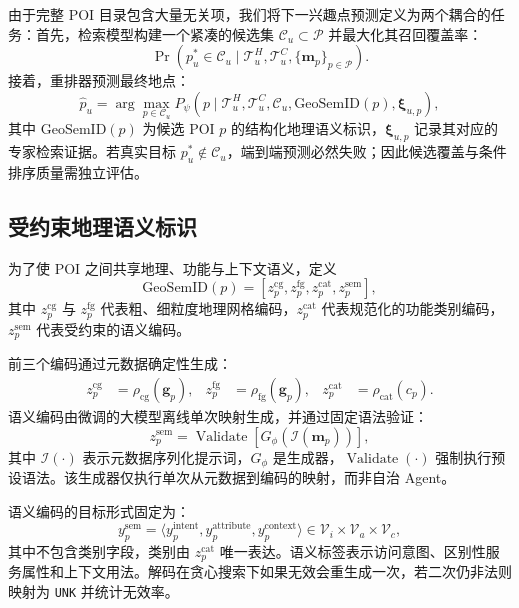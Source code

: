 \documentclass[10pt,fontset=none,twocolumn]{ctexart}
\newcommand{\gsid}{\mathrm{GeoSemID}}
\newcommand{\POIs}{\mathcal{P}}
\begin{document}
由于完整 POI 目录包含大量无关项，我们将下一兴趣点预测定义为两个耦合的任务：首先，检索模型构建一个紧凑的候选集 $\mathcal{C}_u\subset\POIs$ 并最大化其召回覆盖率：
\begin{equation}
\Pr(p_u^{*}\in\mathcal{C}_u
\mid
\mathcal{T}_{u}^{H},\mathcal{T}_{u}^{C},\{\bm{m}_p\}_{p\in\POIs}).
\label{eq:coverage_objective}
\end{equation}
接着，重排器预测最终地点：
\begin{equation}
\widehat{p}_{u}
=
\arg\max_{p\in\mathcal{C}_u}
P_{\psi}
\left(
p\mid
\mathcal{T}_{u}^{H},
\mathcal{T}_{u}^{C},
\mathcal{C}_u,
\gsid(p),
\bm{\xi}_{u,p}
\right),
\label{eq:final_prediction}
\end{equation}
其中 $\gsid(p)$ 为候选 POI $p$ 的结构化地理语义标识，$\bm{\xi}_{u,p}$ 记录其对应的专家检索证据。若真实目标 $p_u^{*}\notin\mathcal{C}_u$，端到端预测必然失败；因此候选覆盖与条件排序质量需独立评估。

\subsection{受约束地理语义标识}

为了使 POI 之间共享地理、功能与上下文语义，定义
\begin{equation}
\gsid(p)
=
[
z_{p}^{\mathrm{cg}},
z_{p}^{\mathrm{fg}},
z_{p}^{\mathrm{cat}},
z_{p}^{\mathrm{sem}}
],
\label{eq:geosemid_definition}
\end{equation}
其中 $z_{p}^{\mathrm{cg}}$ 与 $z_{p}^{\mathrm{fg}}$ 代表粗、细粒度地理网格编码，$z_{p}^{\mathrm{cat}}$ 代表规范化的功能类别编码，$z_{p}^{\mathrm{sem}}$ 代表受约束的语义编码。

前三个编码通过元数据确定性生成：
\begin{align}
z_{p}^{\mathrm{cg}}&=\rho_{\mathrm{cg}}(\bm{g}_p),&
z_{p}^{\mathrm{fg}}&=\rho_{\mathrm{fg}}(\bm{g}_p),&
z_{p}^{\mathrm{cat}}&=\rho_{\mathrm{cat}}(c_p).
\label{eq:deterministic_codes}
\end{align}
语义编码由微调的大模型离线单次映射生成，并通过固定语法验证：
\begin{equation}
z_{p}^{\mathrm{sem}}
=
\operatorname{Validate}
\left[
G_{\phi}\!\left(\mathcal{I}(\bm{m}_p)\right)
\right],
\label{eq:semantic_generation}
\end{equation}
其中 $\mathcal{I}(\cdot)$ 表示元数据序列化提示词，$G_{\phi}$ 是生成器，$\operatorname{Validate}(\cdot)$ 强制执行预设语法。该生成器仅执行单次从元数据到编码的映射，而非自治 Agent。

语义编码的目标形式固定为：
\begin{equation}
y_p^{\mathrm{sem}}
=
\langle
y_p^{\mathrm{intent}},
y_p^{\mathrm{attribute}},
y_p^{\mathrm{context}}
\rangle
\in
\mathcal{V}_{i}\times\mathcal{V}_{a}\times\mathcal{V}_{c},
\label{eq:semantic_schema}
\end{equation}
其中不包含类别字段，类别由 $z_p^{\mathrm{cat}}$ 唯一表达。语义标签表示访问意图、区别性服务属性和上下文用法。解码在贪心搜索下如果无效会重生成一次，若二次仍非法则映射为 \texttt{UNK} 并统计无效率。
\end{document}
